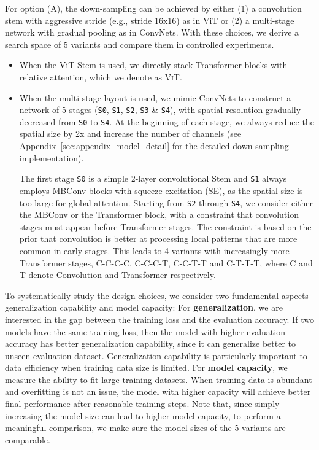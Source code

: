 \documentclass{article}
\begin{document}
For option (A), the down-sampling can be achieved by either (1) a convolution stem with aggressive stride (e.g., stride 16x16) as in ViT or (2) a multi-stage network with gradual pooling as in ConvNets.
With these choices, we derive a search space of 5 variants and compare them in controlled experiments.
\begin{itemize}[leftmargin=*,itemsep=0pt,topsep=0pt,partopsep=0pt]
\item When the ViT Stem is used, we directly stack  Transformer blocks with relative attention, which we denote as \textsc{ViT}.

\item When the multi-stage layout is used, we mimic ConvNets to construct a network of 5 stages (\texttt{S0}, \texttt{S1}, \texttt{S2}, \texttt{S3} \& \texttt{S4}), with spatial resolution gradually decreased from \texttt{S0} to \texttt{S4}.  At the beginning of each stage, we always reduce the spatial size by 2x and increase the number of channels (see Appendix~\ref{sec:appendix_model_detail} for the detailed down-sampling implementation). 

The first stage \texttt{S0} is a simple 2-layer convolutional Stem and \texttt{S1} always employs MBConv blocks with squeeze-excitation (SE), as the spatial size is too large for global attention. 
Starting from \texttt{S2} through \texttt{S4}, we consider either the MBConv or the Transformer block, with a constraint that convolution stages must appear before Transformer stages.
The constraint is based on the prior that convolution is better at processing local patterns that are more common in early stages.
This leads to 4 variants with increasingly more Transformer stages, \textsc{C-C-C-C}, \textsc{C-C-C-T}, \textsc{C-C-T-T} and \textsc{C-T-T-T}, where \textsc{C} and \textsc{T} denote \underline{C}onvolution and \underline{T}ransformer respectively.

\end{itemize}

To systematically study the design choices, we consider two fundamental aspects generalization capability and model capacity: For \textbf{generalization}, we are interested in the gap between the training loss and the evaluation accuracy. If two models have the same training loss, then the model with higher evaluation accuracy has better generalization capability, since it can generalize better to unseen evaluation dataset.  Generalization capability is particularly important to data efficiency when training data size is limited. For \textbf{model capacity}, we measure the ability to fit large training datasets. When training data is abundant and overfitting is not an issue, the model with higher capacity will achieve better final performance after reasonable training steps. 
Note that, since simply increasing the model size can lead to higher model capacity, to perform a meaningful comparison, we make sure the model sizes of the 5 variants are comparable.
\end{document}
